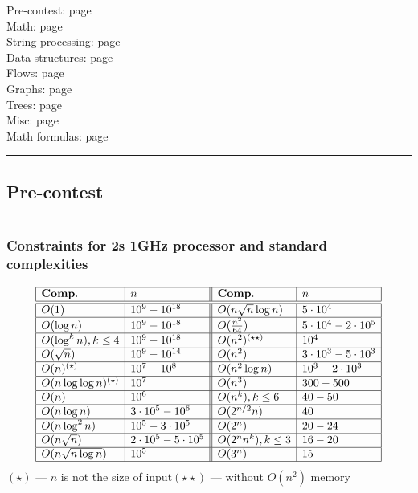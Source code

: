 \documentclass[landscape,a4paper,twocolumn,10pt]{report}
\renewcommand{\line}{\noindent\rule{\linewidth}{1pt}}
\newcommand{\algosection}[1]{\line \subsection*{#1}}
\newcommand{\algorithm}[1]{\line \subsubsection*{#1}}
\begin{document}
\footnotesize

\noindent
Pre-contest: page \pageref{precontest} \\
Math: page \pageref{math} \\
String processing: page \pageref{string} \\
Data structures: page \pageref{datastruct} \\
Flows: page \pageref{flows} \\
Graphs: page \pageref{graphs} \\
Trees: page \pageref{trees} \\
Misc: page \pageref{misc} \\
Math formulas: page \pageref{mathformulas}

\algosection{Pre-contest}
\label{precontest}

%

\algorithm{Constraints for 2s 1GHz processor and standard complexities}
$$
\begin{array}{|l|l||l|l|}
\hline
\mathbf{Comp.} & n & \mathbf{Comp.} & n \\
\hline
\hline
O(1) & 10^9 - 10^{18} & O(n \sqrt{n} \log n) & 5 \cdot 10^4 \\
\hline
O(\log n) & 10^9 - 10^{18} & O(\frac{n^2}{64}) & 5 \cdot 10^4 - 2 \cdot 10^5 \\
\hline
O(\log^{k} n), k \le 4 & 10^9 - 10^{18} & O(n^2)^{(\star \star)} & 10^4 \\
\hline
O(\sqrt{n}) & 10^9 - 10^{14} & O(n^2) & 3 \cdot 10^3 - 5 \cdot 10^3 \\
\hline
O(n)^{(\star)} & 10^7 - 10^8 & O(n^2 \log n) & 10^3 - 2 \cdot 10^3 \\
\hline
O(n \log \log n)^{(\star)} & 10^7 & O(n^3) & 300 - 500 \\
\hline
O(n) & 10^6 & O(n^k), k \le 6 & 40 - 50 \\
\hline
O(n \log n) & 3 \cdot 10^5 - 10^6 & O(2^{n/2} n) & 40 \\
\hline
O(n \log^{2} n) & 10^5 - 3 \cdot 10^5 & O(2^{n}) & 20 - 24 \\
\hline
O(n \sqrt{n}) & 2 \cdot 10^5 - 5 \cdot 10^5 & O(2^{n} n^k), k \le 3 & 16 - 20 \\
\hline
O(n \sqrt{n \log n}) & 10^5 & O(3^n) & 15 \\
\hline
\end{array}
$$
$(\star)$ — $n$ is not the size of input\quad $(\star \star)$ — without $O(n^2)$ memory
\end{document}
